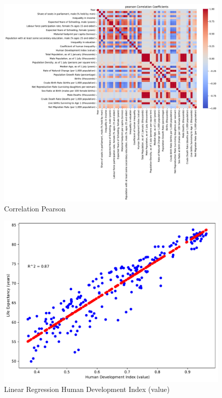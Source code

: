 \documentclass[a4paper]{article}
\begin{document}
\begin{figure}[h]
  \begin{center}
    \includegraphics[width=\textwidth]{ola/pearson_correlation.pdf}
    \caption{Correlation Pearson}
    \label{fig:pearson_correlation}
  \end{center}
\end{figure}

\begin{figure}[h]
  \begin{center}
    \includegraphics[width=\textwidth]{ola/_linear_regression_human_development_index_(value).pdf}
    \caption{Linear Regression Human Development Index (value)}
    \label{fig:reg_human_development_index}
  \end{center}
\end{figure}
\end{document}
